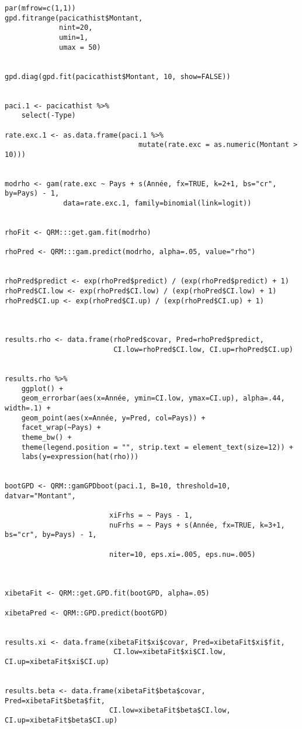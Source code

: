 \begin{lstlisting}
par(mfrow=c(1,1))
gpd.fitrange(pacicathist$Montant, 
             nint=20,
             umin=1, 
             umax = 50)
             
             
gpd.diag(gpd.fit(pacicathist$Montant, 10, show=FALSE))


paci.1 <- pacicathist %>% 
    select(-Type)

rate.exc.1 <- as.data.frame(paci.1 %>% 
                                mutate(rate.exc = as.numeric(Montant > 10)))


modrho <- gam(rate.exc ~ Pays + s(Année, fx=TRUE, k=2+1, bs="cr", by=Pays) - 1, 
              data=rate.exc.1, family=binomial(link=logit)) 


rhoFit <- QRM:::get.gam.fit(modrho)   

rhoPred <- QRM:::gam.predict(modrho, alpha=.05, value="rho")


rhoPred$predict <- exp(rhoPred$predict) / (exp(rhoPred$predict) + 1)
rhoPred$CI.low <- exp(rhoPred$CI.low) / (exp(rhoPred$CI.low) + 1)
rhoPred$CI.up <- exp(rhoPred$CI.up) / (exp(rhoPred$CI.up) + 1)



results.rho <- data.frame(rhoPred$covar, Pred=rhoPred$predict,
                          CI.low=rhoPred$CI.low, CI.up=rhoPred$CI.up)
                          

results.rho %>% 
    ggplot() + 
    geom_errorbar(aes(x=Année, ymin=CI.low, ymax=CI.up), alpha=.44, width=.1) +
    geom_point(aes(x=Année, y=Pred, col=Pays)) + 
    facet_wrap(~Pays) + 
    theme_bw() + 
    theme(legend.position = "", strip.text = element_text(size=12)) + 
    labs(y=expression(hat(rho)))
    

bootGPD <- QRM::gamGPDboot(paci.1, B=10, threshold=10, datvar="Montant",
                         
                         xiFrhs = ~ Pays - 1, 
                         nuFrhs = ~ Pays + s(Année, fx=TRUE, k=3+1, bs="cr", by=Pays) - 1, 
                         
                         niter=10, eps.xi=.005, eps.nu=.005)



xibetaFit <- QRM::get.GPD.fit(bootGPD, alpha=.05) 

xibetaPred <- QRM::GPD.predict(bootGPD)


results.xi <- data.frame(xibetaFit$xi$covar, Pred=xibetaFit$xi$fit,
                          CI.low=xibetaFit$xi$CI.low, CI.up=xibetaFit$xi$CI.up)


results.beta <- data.frame(xibetaFit$beta$covar, Pred=xibetaFit$beta$fit,
                         CI.low=xibetaFit$beta$CI.low, CI.up=xibetaFit$beta$CI.up)



\end{lstlisting}
